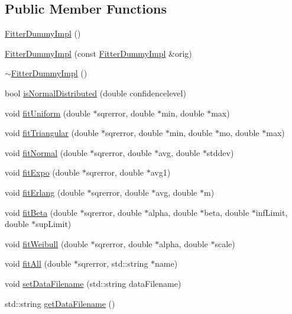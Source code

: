 \subsection*{Public Member Functions}
\begin{DoxyCompactItemize}
\item 
\hyperlink{class_fitter_dummy_impl_ac2060d75934be396c6b050facc0f8287}{Fitter\+Dummy\+Impl} ()
\item 
\hyperlink{class_fitter_dummy_impl_aae635bda7d5e50eb86a42fa939e21316}{Fitter\+Dummy\+Impl} (const \hyperlink{class_fitter_dummy_impl}{Fitter\+Dummy\+Impl} \&orig)
\item 
\hyperlink{class_fitter_dummy_impl_ae3c9e79d56e7ad036e325ed09d363f48}{$\sim$\+Fitter\+Dummy\+Impl} ()
\item 
bool \hyperlink{class_fitter_dummy_impl_abcefd83b1d924eb619d05b96d5333d02}{is\+Normal\+Distributed} (double confidencelevel)
\item 
void \hyperlink{class_fitter_dummy_impl_aa9022eab5092e986d51d222d0f6b83df}{fit\+Uniform} (double $\ast$sqrerror, double $\ast$min, double $\ast$max)
\item 
void \hyperlink{class_fitter_dummy_impl_a7f658b606a7a60870e75314c13cdc137}{fit\+Triangular} (double $\ast$sqrerror, double $\ast$min, double $\ast$mo, double $\ast$max)
\item 
void \hyperlink{class_fitter_dummy_impl_a0cdcea7e8832a6e5d3c091e37b43572d}{fit\+Normal} (double $\ast$sqrerror, double $\ast$avg, double $\ast$stddev)
\item 
void \hyperlink{class_fitter_dummy_impl_a45571be6af04b59830005c1fce561281}{fit\+Expo} (double $\ast$sqrerror, double $\ast$avg1)
\item 
void \hyperlink{class_fitter_dummy_impl_a705126d2de7a2f780bf873fa93f30bd7}{fit\+Erlang} (double $\ast$sqrerror, double $\ast$avg, double $\ast$m)
\item 
void \hyperlink{class_fitter_dummy_impl_a463ddd300c942bad081e90adb47c7e17}{fit\+Beta} (double $\ast$sqrerror, double $\ast$alpha, double $\ast$beta, double $\ast$inf\+Limit, double $\ast$sup\+Limit)
\item 
void \hyperlink{class_fitter_dummy_impl_ac6365f0ca4f7a488c827885c7e174470}{fit\+Weibull} (double $\ast$sqrerror, double $\ast$alpha, double $\ast$scale)
\item 
void \hyperlink{class_fitter_dummy_impl_ad3330dc378a15f51cf4755e014933bfd}{fit\+All} (double $\ast$sqrerror, std\+::string $\ast$name)
\item 
void \hyperlink{class_fitter_dummy_impl_ad76a111c4782d4dfd612b01bcb9e837a}{set\+Data\+Filename} (std\+::string data\+Filename)
\item 
std\+::string \hyperlink{class_fitter_dummy_impl_ac17dfc836c2b5e224b70a3535598f564}{get\+Data\+Filename} ()
\end{DoxyCompactItemize}


